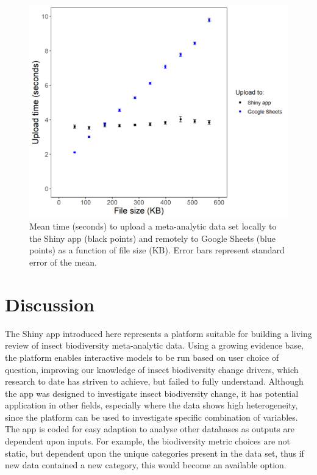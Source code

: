\documentclass[11pt]{article}
\begin{document}
		\begin{figure}[H] 
			\centering 
			\includegraphics[scale=1]{figure_6_upload_data_time_graph.png} 
			\caption{Mean time (seconds) to upload a meta-analytic data set locally to the Shiny app (black points) and remotely to Google Sheets (blue points) as a function of file size (KB). Error bars represent standard error of the mean.}  
		\end{figure}
		
		\clearpage
		
		\section{Discussion}
		The Shiny app introduced here represents a platform suitable for building a living review of insect biodiversity meta-analytic data. Using a growing evidence base, the platform enables interactive models to be run based on user choice of question, improving our knowledge of insect biodiversity change drivers, which research to date has striven to achieve, but failed to fully understand. Although the app was designed to investigate insect biodiversity change, it has potential application in other fields, especially where the data shows high heterogeneity, since the platform can be used to investigate specific combination of variables. The app is coded for easy adaption to analyse other databases as outputs are dependent upon inputs. For example, the biodiversity metric choices are not static, but dependent upon the unique categories present in the data set, thus if new data contained a new category, this would become an available option.  
		
\end{document}
